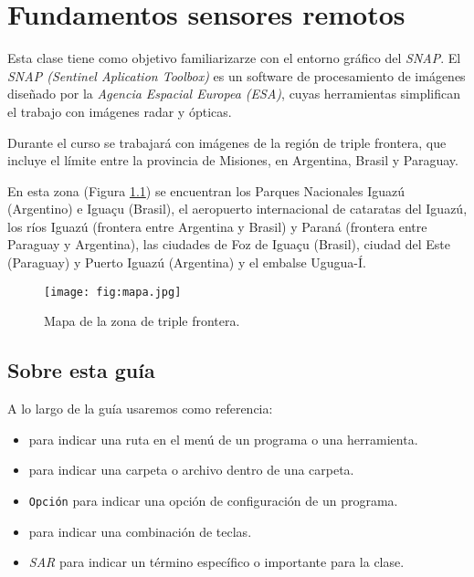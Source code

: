 \chapter{Fundamentos sensores remotos}

Esta clase tiene como objetivo familiarizarze con el entorno gráfico del \emph{SNAP}. El \emph{SNAP (Sentinel Aplication Toolbox)} es un  software de procesamiento de imágenes diseñado por la \emph{Agencia Espacial Europea (ESA)}, cuyas herramientas simplifican el trabajo con imágenes radar y ópticas.

Durante el curso se trabajará con imágenes de la región de triple frontera, que incluye el límite entre la provincia de Misiones, en Argentina, Brasil y Paraguay.

En esta zona (Figura \ref{fig:mapa}) se encuentran los Parques Nacionales Iguazú (Argentino) e Iguaçu (Brasil), el aeropuerto internacional de cataratas del Iguazú, los ríos Iguazú (frontera entre Argentina y Brasil) y Paraná (frontera entre Paraguay y Argentina), las ciudades de Foz de Iguaçu (Brasil), ciudad del Este (Paraguay) y Puerto Iguazú (Argentina) y el embalse Ugugua-Í.

\begin{figure}[h!]
    \centering
    \texttt{[image: fig:mapa.jpg]}
    \caption{Mapa de la zona de triple frontera.}
    \label{fig:mapa}
\end{figure}

\section{Sobre esta guía}

A lo largo de la guía usaremos como referencia:

\begin{itemize}
  \item {} para indicar una ruta en el menú de un programa o una herramienta.
  \item {} para indicar una carpeta o archivo dentro de una carpeta.
  \item \texttt{Opción} para indicar una opción de configuración de un programa.
  \item {} para indicar una combinación de teclas.
  \item \emph{SAR} para indicar un término específico o importante para la clase.
\end{itemize}

